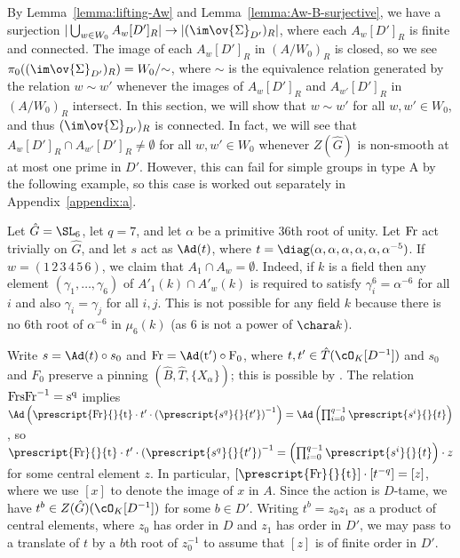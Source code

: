 By Lemma~\ref{lemma:lifting-Aw} and Lemma~\ref{lemma:Aw-B-surjective}, we have a surjection $|\bigcup_{w \in W_0} A_w[D']_R| \to |(\im \ov{\Sigma}_{D'})_R|$, where each $A_w[D']_R$ is finite and connected. The image of each $A_w[D']_R$ in $(A/W_0)_R$ is closed, so we see $\pi_0((\im \ov{\Sigma}_{D'})_R) = W_0/{\sim}$, where $\sim$ is the equivalence relation generated by the relation $w \sim w'$ whenever the images of $A_w[D']_R$ and $A_{w'}[D']_R$ in $(A/W_0)_R$ intersect. In this section, we will show that $w \sim w'$ for all $w, w' \in W_0$, and thus $(\im \ov{\Sigma}_{D'})_R$ is connected. In fact, we will see that $A_w[D']_R \cap A_{w'}[D']_R \neq \emptyset$ for all $w, w' \in W_0$ whenever $Z(\hat{G})$ is non-smooth at at most one prime in $D'$. However, this can fail for simple groups in type A by the following example, so this case is worked out separately in Appendix~\ref{appendix:a}.

\begin{example}\label{example:type-A}
    Let $\hat{G} = \SL_6$, let $q = 7$, and let $\alpha$ be a primitive $36$th root of unity. Let $\rm{Fr}$ act trivially on $\hat{G}$, and let $s$ act as $\Ad(t)$, where $t = \diag(\alpha, \alpha, \alpha, \alpha, \alpha, \alpha^{-5})$. If $w = (1\, 2\, 3\, 4\, 5\, 6)$, we claim that $A_1 \cap A_w = \emptyset$. Indeed, if $k$ is a field then any element $(\gamma_1, \dots, \gamma_6)$ of $A'_1(k) \cap A'_w(k)$ is required to satisfy $\gamma_i^6 = \alpha^{-6}$ for all $i$ and also $\gamma_i = \gamma_j$ for all $i, j$. This is not possible for any field $k$ because there is no $6$th root of $\alpha^{-6}$ in $\mu_6(k)$ (as $6$ is not a power of $\chara k$).
\end{example}

Write $s = \Ad(t) \circ s_0$ and $\rm{Fr} = \Ad(t') \circ F_0$, where $t, t' \in \hat{T}(\cO_K[D^{-1}])$ and $s_0$ and $F_0$ preserve a pinning $(\hat{B}, \hat{T}, \{X_\alpha\})$; this is possible by \cite[XXIV, 1.3]{SGA3III}. The relation $\rm{Fr} s \rm{Fr}^{-1} = s^q$ implies $\Ad\left(\prescript{\rm{Fr}}{}{t} \cdot t' \cdot \left(\prescript{s^q}{}{t'}\right)^{-1}\right) = \Ad\left(\prod_{i=0}^{q-1} \prescript{s^i}{}{t}\right)$, so $\prescript{\rm{Fr}}{}{t} \cdot t' \cdot \left(\prescript{s^q}{}{t'}\right)^{-1} = \left(\prod_{i=0}^{q-1} \prescript{s^i}{}{t}\right) \cdot z$ for some central element $z$. In particular, $[\prescript{\rm{Fr}}{}{t}] \cdot [t^{-q}] = [z]$, where we use $[x]$ to denote the image of $x$ in $A$. Since the action is $D$-tame, we have $t^b \in Z(\hat{G})(\cO_K[D^{-1}])$ for some $b \in D'$. Writing $t^b = z_0 z_1$ as a product of central elements, where $z_0$ has order in $D$ and $z_1$ has order in $D'$, we may pass to a translate of $t$ by a $b$th root of $z_0^{-1}$ to assume that $[z]$ is of finite order in $D'$.

